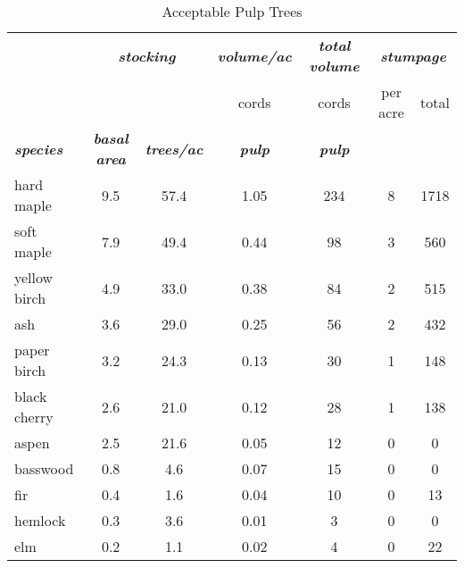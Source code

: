 \documentclass[landscape]{article}
\begin{document}
\begin{table}[H]

\caption{\label{tab:unnamed-chunk-7}Acceptable Pulp Trees}
\fontsize{10}{12}\selectfont
\begin{tabular}[t]{lcccccc}
\toprule
\multicolumn{1}{c}{\em{\textbf{ }}} & \multicolumn{2}{c}{\em{\textbf{stocking}}} & \multicolumn{1}{c}{\em{\textbf{volume/ac }}} & \multicolumn{1}{c}{\em{\textbf{total volume}}} & \multicolumn{2}{c}{\em{\textbf{stumpage}}} \\
\cmidrule(l{3pt}r{3pt}){2-3} \cmidrule(l{3pt}r{3pt}){4-4} \cmidrule(l{3pt}r{3pt}){5-5} \cmidrule(l{3pt}r{3pt}){6-7}
\multicolumn{3}{c}{ } & \multicolumn{1}{c}{cords} & \multicolumn{1}{c}{cords} & \multicolumn{1}{c}{per acre} & \multicolumn{1}{c}{total} \\
\cmidrule(l{3pt}r{3pt}){4-4} \cmidrule(l{3pt}r{3pt}){5-5} \cmidrule(l{3pt}r{3pt}){6-6} \cmidrule(l{3pt}r{3pt}){7-7}
\rowcolor[HTML]{DCDCDC}  \em{\textbf{species}} & \em{\textbf{basal area}} & \em{\textbf{trees/ac}} & \em{\textbf{pulp}} & \em{\textbf{pulp}} & \em{\textbf{ }} & \em{\textbf{ }}\\
\midrule
\rowcolor{gray!6}  hard maple & 9.5 & 57.4 & 1.05 & 234 & 8 & 1718\\
 
soft maple & 7.9 & 49.4 & 0.44 & 98 & 3 & 560\\
 
\rowcolor{gray!6}  yellow birch & 4.9 & 33.0 & 0.38 & 84 & 2 & 515\\
 
ash & 3.6 & 29.0 & 0.25 & 56 & 2 & 432\\
 
\rowcolor{gray!6}  paper birch & 3.2 & 24.3 & 0.13 & 30 & 1 & 148\\
 
black cherry & 2.6 & 21.0 & 0.12 & 28 & 1 & 138\\
 
\rowcolor{gray!6}  aspen & 2.5 & 21.6 & 0.05 & 12 & 0 & 0\\
 
basswood & 0.8 & 4.6 & 0.07 & 15 & 0 & 0\\
 
\rowcolor{gray!6}  fir & 0.4 & 1.6 & 0.04 & 10 & 0 & 13\\
 
hemlock & 0.3 & 3.6 & 0.01 & 3 & 0 & 0\\
 
\rowcolor{gray!6}  elm & 0.2 & 1.1 & 0.02 & 4 & 0 & 22\\
 

\end{tabular}
\end{table}
\end{document}
